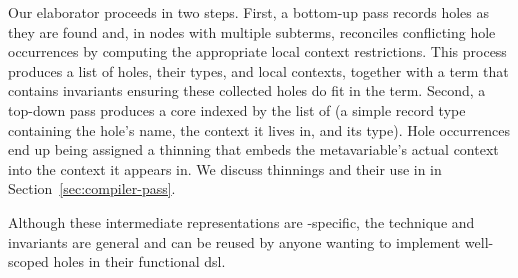 Our elaborator proceeds in two steps.
%
First, a bottom-up pass records holes as they are found and, in nodes with multiple subterms, reconciles conflicting hole occurrences by computing the appropriate local context restrictions.
%
This process produces a list of holes, their types, and local contexts,
together with a  term that contains invariants ensuring
these collected holes do fit in the term.
%
Second, a top-down pass produces a core  indexed by the list of  (a simple record type containing the hole's name, the context it lives in, and its type).
%
Hole occurrences end up being assigned a thinning that embeds the metavariable's actual context into the context it appears in.
We discuss thinnings and their use in \Velo{} in Section~\ref{sec:compiler-pass}.

Although these intermediate representations are \Velo{}-specific, the technique
and invariants are general and can be reused by anyone wanting to implement
well-scoped holes in their functional \ac{dsl}.

